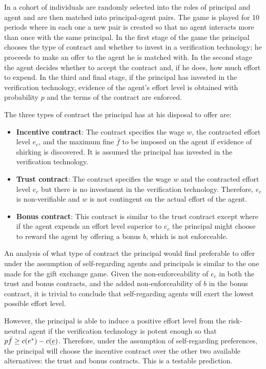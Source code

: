 \documentclass[12pt]{article}
\newcommand{\ubar}[1]{\underaccent{\bar}{#1}}
\begin{document}
In \cite{fehr2007fairness} a cohort of individuals are randomly selected into the roles of principal and agent and are then matched into principal-agent pairs. The game is played for 10 periods where in each one a new pair is created so that no agent interacts more than once with the same principal. In the first stage of the game the principal chooses the type of contract and whether to invest in a verification technology; he proceeds to make an offer to the agent he is matched with. In the second stage the agent decides whether to accept the contract and, if he does, how much effort to expend. In the third and final stage, if the principal has invested in the verification technology, evidence of the agent's effort level is obtained with probability $p$ and the terms of the contract are enforced.

The three types of contract the principal has at his disposal to offer are:

\begin{itemize}
	\item \textbf{Incentive contract}: The contract specifies the wage $w$, the contracted effort level $e_c$, and the maximum fine $\bar{f}$ to be imposed on the agent if evidence of shirking is discovered. It is assumed the principal has invested in the verification technology.
	\item \textbf{Trust contract}: The contract specifies the wage $w$ and the contracted effort level $e_c$ but there is no investment in the verification technology. Therefore, $e_c$ is non-verifiable and $w$ is not contingent on the actual effort of the agent.
	\item \textbf{Bonus contract}: This contract is similar to the trust contract except where if the agent expends an effort level superior to $e_c$ the principal might choose to reward the agent by offering a bonus $b$, which is not enforceable.
\end{itemize}

An analysis of what type of contract the principal would find preferable to offer under the assumption of self-regarding agents and principals is similar to the one made for the gift exchange game. Given the non-enforceability of $e_c$ in both the trust and bonus contracts, and the added non-enforceability of $b$ in the bonus contract, it is trivial to conclude that self-regarding agents will exert the lowest possible effort level. 

However, the principal is able to induce a positive effort level from the risk-neutral agent if the verification technology is potent enough so that $p\bar{f} \geq c(e^*) - c(\ubar{e})$. Therefore, under the assumption of self-regarding preferences, the principal will choose the incentive contract over the other two available alternatives: the trust and bonus contracts. This is a testable prediction.
\end{document}

